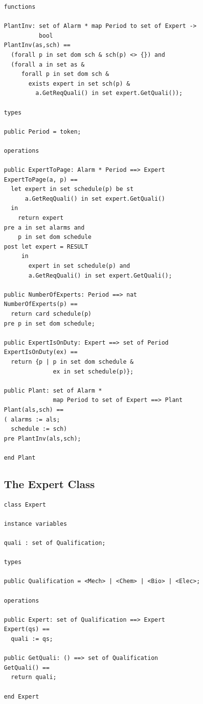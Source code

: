 \begin{lstlisting}
functions

PlantInv: set of Alarm * map Period to set of Expert -> 
          bool
PlantInv(as,sch) ==
  (forall p in set dom sch & sch(p) <> {}) and
  (forall a in set as &
     forall p in set dom sch &
       exists expert in set sch(p) &
         a.GetReqQuali() in set expert.GetQuali());

types

public Period = token;

operations

public ExpertToPage: Alarm * Period ==> Expert
ExpertToPage(a, p) ==
  let expert in set schedule(p) be st
      a.GetReqQuali() in set expert.GetQuali()
  in
    return expert
pre a in set alarms and
    p in set dom schedule
post let expert = RESULT
     in
       expert in set schedule(p) and
       a.GetReqQuali() in set expert.GetQuali();

public NumberOfExperts: Period ==> nat
NumberOfExperts(p) ==
  return card schedule(p)
pre p in set dom schedule;

public ExpertIsOnDuty: Expert ==> set of Period
ExpertIsOnDuty(ex) ==
  return {p | p in set dom schedule & 
              ex in set schedule(p)};

public Plant: set of Alarm * 
              map Period to set of Expert ==> Plant
Plant(als,sch) ==
( alarms := als;
  schedule := sch)
pre PlantInv(als,sch);

end Plant
\end{lstlisting}

\subsection{The Expert Class}

\begin{lstlisting}
class Expert

instance variables

quali : set of Qualification;

types
 
public Qualification = <Mech> | <Chem> | <Bio> | <Elec>;

operations

public Expert: set of Qualification ==> Expert
Expert(qs) ==
  quali := qs;

public GetQuali: () ==> set of Qualification
GetQuali() ==
  return quali;
  
end Expert
\end{lstlisting}

